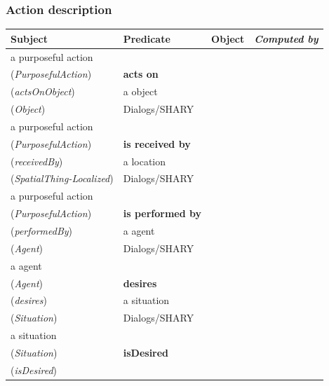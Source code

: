 \documentclass{svmult}
\begin{document}
\subsubsection{Action description}

\begin{table}[h]
	\centering
	\begin{tabular}{p{3cm}p{6cm}p{3cm}l}
		\textbf{Subject} & \textbf{Predicate} & \textbf{Object} & \emph{Computed by} \\
		\hline

 a purposeful action
\\ (\emph{PurposefulAction})  & 

\textbf{acts on}
\\ (\emph{actsOnObject})  & 

 a object
\\ (\emph{Object})  & 

 Dialogs/SHARY  \\ 


 a purposeful action
\\ (\emph{PurposefulAction})  & 

\textbf{is received by}
\\ (\emph{receivedBy})  & 

 a location
\\ (\emph{SpatialThing-Localized})  & 

 Dialogs/SHARY  \\ 


 a purposeful action
\\ (\emph{PurposefulAction})  & 

\textbf{is performed by}
\\ (\emph{performedBy})  & 

 a agent
\\ (\emph{Agent})  & 

 Dialogs/SHARY  \\ 


 a agent
\\ (\emph{Agent})  & 

\textbf{desires}
\\ (\emph{desires})  & 

 a situation
\\ (\emph{Situation})  & 

 Dialogs/SHARY \\ 


 a situation
\\ (\emph{Situation})  & 

\textbf{isDesired}
\\ (\emph{isDesired})  & 


\end{tabular}
\end{table}
\end{document}
